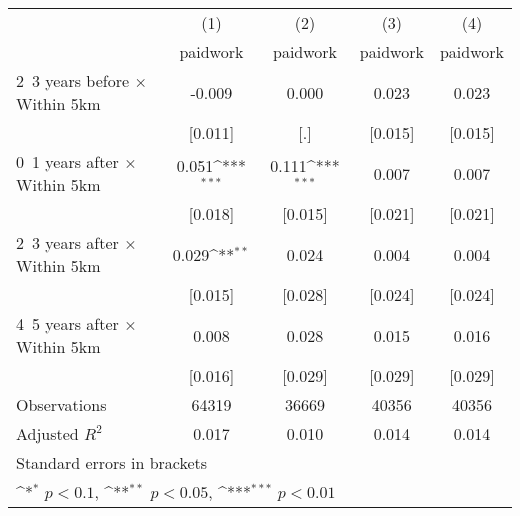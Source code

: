 {
\def\sym#1{\ifmmode^{#1}\else\(^{#1}\)\fi}
\begin{tabular}{l*{4}{c}}
\hline\hline
                    &\multicolumn{1}{c}{(1)}&\multicolumn{1}{c}{(2)}&\multicolumn{1}{c}{(3)}&\multicolumn{1}{c}{(4)}\\
                    &\multicolumn{1}{c}{paidwork}&\multicolumn{1}{c}{paidwork}&\multicolumn{1}{c}{paidwork}&\multicolumn{1}{c}{paidwork}\\
\hline
2~3 years before × Within 5km&      -0.009         &       0.000         &       0.023         &       0.023         \\
                    &     [0.011]         &         [.]         &     [0.015]         &     [0.015]         \\
0~1 years after × Within 5km&       0.051\sym{***}&       0.111\sym{***}&       0.007         &       0.007         \\
                    &     [0.018]         &     [0.015]         &     [0.021]         &     [0.021]         \\
2~3 years after × Within 5km&       0.029\sym{**} &       0.024         &       0.004         &       0.004         \\
                    &     [0.015]         &     [0.028]         &     [0.024]         &     [0.024]         \\
4~5 years after × Within 5km&       0.008         &       0.028         &       0.015         &       0.016         \\
                    &     [0.016]         &     [0.029]         &     [0.029]         &     [0.029]         \\
\hline
Observations        &       64319         &       36669         &       40356         &       40356         \\
Adjusted \(R^{2}\)  &       0.017         &       0.010         &       0.014         &       0.014         \\
\hline\hline
\multicolumn{5}{l}{\footnotesize Standard errors in brackets}\\
\multicolumn{5}{l}{\footnotesize \sym{*} \(p<0.1\), \sym{**} \(p<0.05\), \sym{***} \(p<0.01\)}\\
\end{tabular}
}
